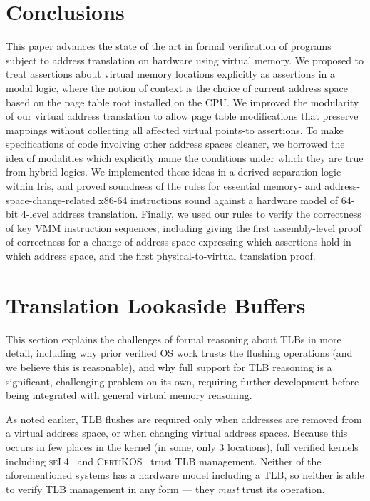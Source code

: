 \documentclass[acmsmall,screen,nonacm,review,anonymous]{acmart}
\begin{document}
\section{Conclusions}
This paper advances the state of the art in formal verification of programs subject to address translation
on hardware using virtual memory. We proposed to treat assertions about virtual
memory locations explicitly as assertions in a modal logic, where the notion of context
is the choice of current address space based on the page table root installed on the CPU.
We improved the modularity of our virtual address translation to allow page table modifications that
preserve mappings without collecting all affected virtual points-to assertions.
To make specifications of code involving other address spaces cleaner, we borrowed the idea of
modalities which explicitly name the conditions under which they are true from hybrid logics.
We implemented these ideas in a derived separation logic within Iris, and proved soundness of
the rules for essential memory- and address-space-change-related x86-64 instructions 
sound against a hardware model of 64-bit 4-level address translation.
Finally, we used our rules to verify the correctness of key VMM instruction sequences,
including giving the first assembly-level proof of correctness for a change
of address space expressing which assertions hold in which address space, and the first physical-to-virtual translation proof.




\appendix
\section{Translation Lookaside Buffers}
\label{apdx:tlb}
This section explains the challenges of formal reasoning about TLBs in more detail, including why
prior verified OS work trusts the flushing operations (and we believe this is reasonable), and why
full support for TLB reasoning is a significant, challenging problem on its own, requiring further
development before being integrated with general virtual memory reasoning.

As noted earlier,
TLB flushes are required only when addresses are removed from a virtual address space, or when changing
virtual address spaces. Because this occurs in few places in the kernel (in some, only 3 locations), full verified
kernels including \textsc{seL4}~\cite{Klein2009seL4,seL4TOCS} and \textsc{CertiKOS}~\cite{gu15,gu2016certikos}
trust TLB management. Neither of the aforementioned systems has a hardware model including a TLB, so neither is able
to verify TLB management in any form --- they \emph{must} trust its operation.
\end{document}

